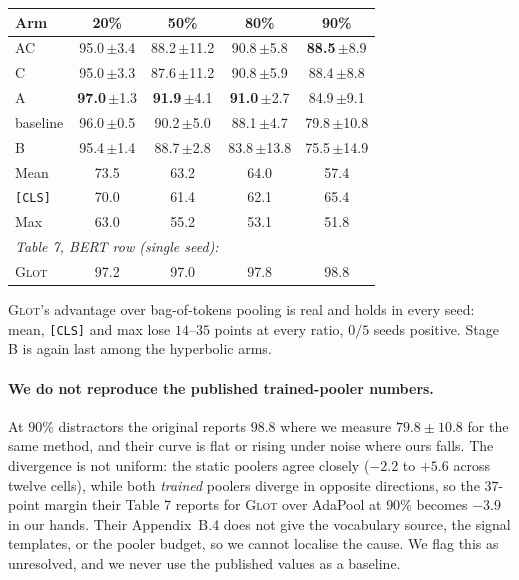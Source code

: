 \documentclass{article}
\begin{document}
\begin{center}
\small
\begin{tabular}{lcccc}
\toprule
Arm & 20\% & 50\% & 80\% & 90\% \\
\midrule
AC       & 95.0\,$\pm$3.4 & 88.2\,$\pm$11.2 & 90.8\,$\pm$5.8 & \textbf{88.5}\,$\pm$8.9 \\
C        & 95.0\,$\pm$3.3 & 87.6\,$\pm$11.2 & 90.8\,$\pm$5.9 & 88.4\,$\pm$8.8 \\
A        & \textbf{97.0}\,$\pm$1.3 & \textbf{91.9}\,$\pm$4.1 & \textbf{91.0}\,$\pm$2.7 & 84.9\,$\pm$9.1 \\
baseline & 96.0\,$\pm$0.5 & 90.2\,$\pm$5.0 & 88.1\,$\pm$4.7 & 79.8\,$\pm$10.8 \\
B        & 95.4\,$\pm$1.4 & 88.7\,$\pm$2.8 & 83.8\,$\pm$13.8 & 75.5\,$\pm$14.9 \\
\midrule
Mean           & 73.5 & 63.2 & 64.0 & 57.4 \\
\texttt{[CLS]} & 70.0 & 61.4 & 62.1 & 65.4 \\
Max            & 63.0 & 55.2 & 53.1 & 51.8 \\
\midrule
\multicolumn{5}{l}{\emph{\citet{mantri2026glot} Table 7, BERT row (single seed):}} \\
\textsc{Glot}  & 97.2 & 97.0 & 97.8 & 98.8 \\
\bottomrule
\end{tabular}
\end{center}

\textsc{Glot}'s advantage over bag-of-tokens pooling is real and holds in every
seed: mean, \texttt{[CLS]} and max lose $14$--$35$ points at every ratio, $0/5$
seeds positive. Stage B is again last among the hyperbolic arms.

\paragraph{We do not reproduce the published trained-pooler numbers.} At $90\%$
distractors the original reports $98.8$ where we measure $79.8 \pm 10.8$ for the
same method, and their curve is flat or rising under noise where ours falls. The
divergence is not uniform: the static poolers agree closely ($-2.2$ to $+5.6$
across twelve cells), while both \emph{trained} poolers diverge in opposite
directions, so the $37$-point margin their Table 7 reports for \textsc{Glot}
over AdaPool at $90\%$ becomes $-3.9$ in our hands. Their Appendix~B.4 does not
give the vocabulary source, the signal templates, or the pooler budget, so we
cannot localise the cause. We flag this as unresolved, and we never use the
published values as a baseline.
\end{document}
